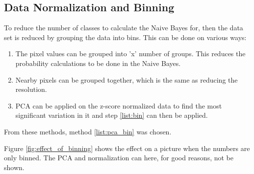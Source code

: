 \subsection{Data Normalization and Binning}

To reduce the number of classes to calculate the Naive Bayes for, then the data set is reduced by grouping the data into bins.
This can be done on various ways:

\begin{enumerate}
\item The pixel values can be grouped into 'x' number of groups.
This reduces the probability calculations to be done in the Naive Bayes. \label{list:bin}
\item Nearby pixels can be grouped together, which is the same as reducing the resolution.
\item PCA can be applied on the z-score normalized data to find the most significant variation in it and step \ref{list:bin} can then be applied. \label{list:pca_bin}
\end{enumerate}

From these methods, method \ref{list:pca_bin} was chosen.

Figure \ref{fig:effect_of_binning} shows the effect on a picture when the numbers are only binned.
The PCA and normalization can here, for good reasons, not be shown.


